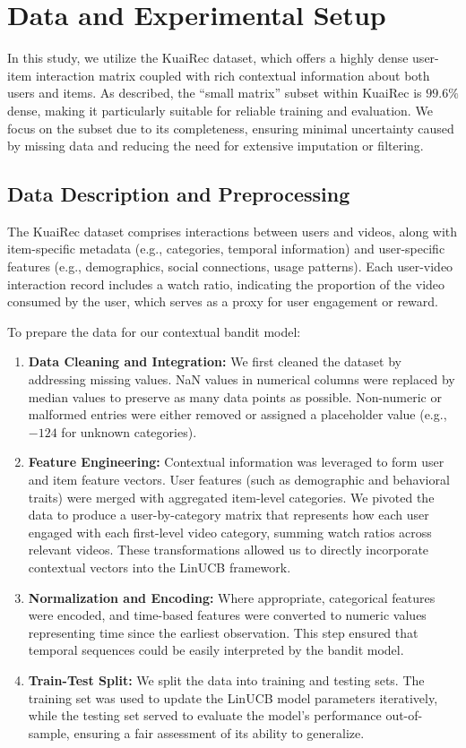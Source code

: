 \section{Data and Experimental Setup}

In this study, we utilize the KuaiRec dataset, which offers a highly dense user-item interaction matrix coupled with rich contextual information about both users and items. As described, the “small matrix” subset within KuaiRec is $99.6\%$ dense, making it particularly suitable for reliable training and evaluation. We focus on the subset due to its completeness, ensuring minimal uncertainty caused by missing data and reducing the need for extensive imputation or filtering.

\subsection{Data Description and Preprocessing}

The KuaiRec dataset comprises interactions between users and videos, along with item-specific metadata (e.g., categories, temporal information) and user-specific features (e.g., demographics, social connections, usage patterns). Each user-video interaction record includes a watch ratio, indicating the proportion of the video consumed by the user, which serves as a proxy for user engagement or reward.

To prepare the data for our contextual bandit model:

\begin{enumerate}
    \item \textbf{Data Cleaning and Integration:} We first cleaned the dataset by addressing missing values. NaN values in numerical columns were replaced by median values to preserve as many data points as possible. Non-numeric or malformed entries were either removed or assigned a placeholder value (e.g., \(-124\) for unknown categories).

    \item \textbf{Feature Engineering:} Contextual information was leveraged to form user and item feature vectors. User features (such as demographic and behavioral traits) were merged with aggregated item-level categories. We pivoted the data to produce a user-by-category matrix that represents how each user engaged with each first-level video category, summing watch ratios across relevant videos. These transformations allowed us to directly incorporate contextual vectors into the LinUCB framework.

    \item \textbf{Normalization and Encoding:} Where appropriate, categorical features were encoded, and time-based features were converted to numeric values representing time since the earliest observation. This step ensured that temporal sequences could be easily interpreted by the bandit model.

    \item \textbf{Train-Test Split:} We split the data into training and testing sets. The training set was used to update the LinUCB model parameters iteratively, while the testing set served to evaluate the model’s performance out-of-sample, ensuring a fair assessment of its ability to generalize.
\end{enumerate}